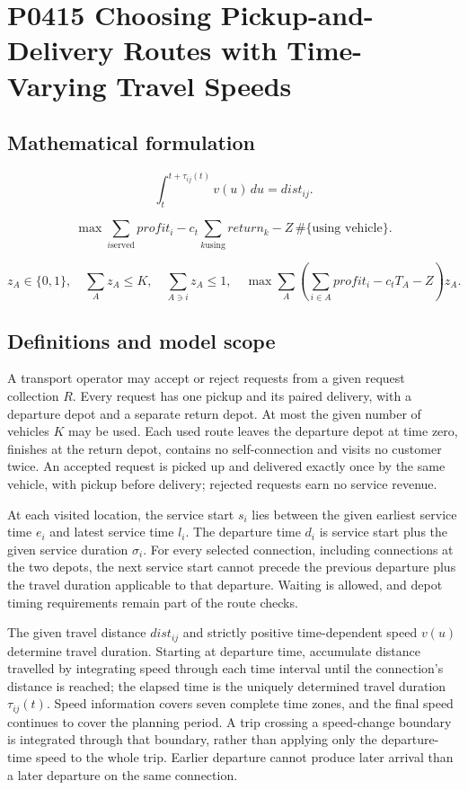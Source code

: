 \documentclass[10pt]{article}
\begin{document}
\section*{P0415 Choosing Pickup-and-Delivery Routes with Time-Varying Travel Speeds}
\subsection*{Mathematical formulation}
\[
\int_t^{t+\tau_{ij}(t)}v(u)\,du=dist_{ij}.
\]

\[
\max \sum_{i\text{served}}profit_i-c_t\sum_{k\text{using}}return_k-Z\,\#\{\text{using vehicle}\}.
\]

\[
z_A\in\{0,1\},\quad\sum_Az_A\le K,\quad\sum_{A\ni i}z_A\le1,\quad
\max\sum_A\left(\sum_{i\in A}profit_i-c_tT_A-Z\right)z_A.
\]

\subsection*{Definitions and model scope}
A transport operator may accept or reject requests from a given request collection $R$. Every request has one pickup and its paired delivery, with a departure depot and a separate return depot. At most the given number of vehicles $K$ may be used. Each used route leaves the departure depot at time zero, finishes at the return depot, contains no self-connection and visits no customer twice. An accepted request is picked up and delivered exactly once by the same vehicle, with pickup before delivery; rejected requests earn no service revenue.

At each visited location, the service start $s_i$ lies between the given earliest service time $e_i$ and latest service time $l_i$. The departure time $d_i$ is service start plus the given service duration $\sigma_i$. For every selected connection, including connections at the two depots, the next service start cannot precede the previous departure plus the travel duration applicable to that departure. Waiting is allowed, and depot timing requirements remain part of the route checks.

The given travel distance $dist_{ij}$ and strictly positive time-dependent speed $v(u)$ determine travel duration. Starting at departure time, accumulate distance travelled by integrating speed through each time interval until the connection's distance is reached; the elapsed time is the uniquely determined travel duration $\tau_{ij}(t)$. Speed information covers seven complete time zones, and the final speed continues to cover the planning period. A trip crossing a speed-change boundary is integrated through that boundary, rather than applying only the departure-time speed to the whole trip. Earlier departure cannot produce later arrival than a later departure on the same connection.
\end{document}
